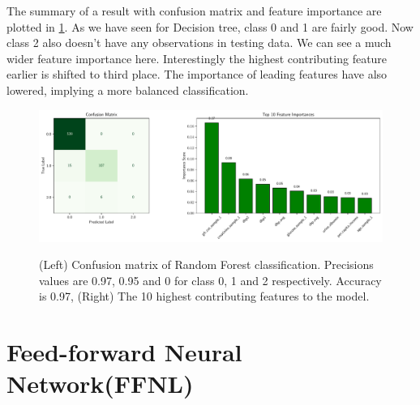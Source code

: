 \documentclass{article}
\begin{document}
The summary of a result with confusion matrix and feature importance are plotted in \ref{rfsum}. As we have seen for 
Decision tree, class 0 and 1 are fairly good. Now class 2 also doesn't have any observations in testing data. We can see 
a much wider feature importance here. Interestingly the highest contributing feature earlier is shifted to third place. 
The importance of leading features have also lowered, implying a more balanced classification.  

\begin{figure}
    \includegraphics[scale=.5]{RF_summary.pdf}
    \label{rfsum}
    \caption{(Left) Confusion matrix of Random Forest classification. Precisions values are 
    0.97, 0.95 and 0 for class 0, 1 and 2 respectively. Accuracy is 0.97, (Right) The 10 highest contributing features
    to the model.}
\end{figure}


\section{Feed-forward Neural Network(FFNL)}
\end{document}
